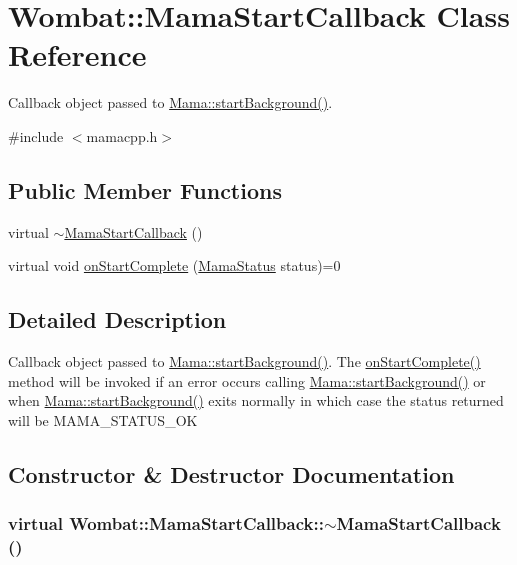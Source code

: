 \hypertarget{classWombat_1_1MamaStartCallback}{
\section{Wombat::MamaStartCallback Class Reference}
\label{classWombat_1_1MamaStartCallback}
}


Callback object passed to \hyperlink{classWombat_1_1Mama_a3fe589a62f5cd705944b8ea6215b4aa3}{Mama::startBackground()}.  


{\ttfamily \#include $<$mamacpp.h$>$}\subsection*{Public Member Functions}
\begin{DoxyCompactItemize}
\item 
virtual \hyperlink{classWombat_1_1MamaStartCallback_a3cacef15c9650324c3a21a602606cf53}{$\sim$MamaStartCallback} ()
\item 
virtual void \hyperlink{classWombat_1_1MamaStartCallback_ab8fceb926edc9c4306b559ebe290925f}{onStartComplete} (\hyperlink{classWombat_1_1MamaStatus}{MamaStatus} status)=0
\end{DoxyCompactItemize}


\subsection{Detailed Description}
Callback object passed to \hyperlink{classWombat_1_1Mama_a3fe589a62f5cd705944b8ea6215b4aa3}{Mama::startBackground()}. The \hyperlink{classWombat_1_1MamaStartCallback_ab8fceb926edc9c4306b559ebe290925f}{onStartComplete()} method will be invoked if an error occurs calling \hyperlink{classWombat_1_1Mama_a3fe589a62f5cd705944b8ea6215b4aa3}{Mama::startBackground()} or when \hyperlink{classWombat_1_1Mama_a3fe589a62f5cd705944b8ea6215b4aa3}{Mama::startBackground()} exits normally in which case the status returned will be MAMA\_\-STATUS\_\-OK 

\subsection{Constructor \& Destructor Documentation}
\hypertarget{classWombat_1_1MamaStartCallback_a3cacef15c9650324c3a21a602606cf53}{
\subsubsection[{$\sim$MamaStartCallback}]{\setlength{\rightskip}{0pt plus 5cm}virtual Wombat::MamaStartCallback::$\sim$MamaStartCallback ()}}
\label{classWombat_1_1MamaStartCallback_a3cacef15c9650324c3a21a602606cf53}


